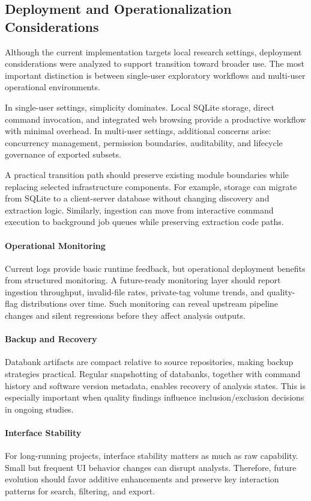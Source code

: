 \subsection{Deployment and Operationalization Considerations}
Although the current implementation targets local research settings, deployment considerations were analyzed to support transition toward broader use. The most important distinction is between single-user exploratory workflows and multi-user operational environments.

In single-user settings, simplicity dominates. Local SQLite storage, direct command invocation, and integrated web browsing provide a productive workflow with minimal overhead. In multi-user settings, additional concerns arise: concurrency management, permission boundaries, auditability, and lifecycle governance of exported subsets.

A practical transition path should preserve existing module boundaries while replacing selected infrastructure components. For example, storage can migrate from SQLite to a client-server database without changing discovery and extraction logic. Similarly, ingestion can move from interactive command execution to background job queues while preserving extraction code paths.

\paragraph{Operational Monitoring}
Current logs provide basic runtime feedback, but operational deployment benefits from structured monitoring. A future-ready monitoring layer should report ingestion throughput, invalid-file rates, private-tag volume trends, and quality-flag distributions over time. Such monitoring can reveal upstream pipeline changes and silent regressions before they affect analysis outputs.

\paragraph{Backup and Recovery}
Databank artifacts are compact relative to source repositories, making backup strategies practical. Regular snapshotting of databanks, together with command history and software version metadata, enables recovery of analysis states. This is especially important when quality findings influence inclusion/exclusion decisions in ongoing studies.

\paragraph{Interface Stability}
For long-running projects, interface stability matters as much as raw capability. Small but frequent UI behavior changes can disrupt analysts. Therefore, future evolution should favor additive enhancements and preserve key interaction patterns for search, filtering, and export.

